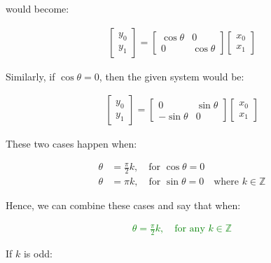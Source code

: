\documentclass{article}
\begin{document}
would become:

\begin{align*}
    \begin{bmatrix}
        y_0 \\
        y_1 
    \end{bmatrix}
    = 
    \begin{bmatrix}
        \cos \theta & 0 \\
        0 & \cos \theta
    \end{bmatrix}
    \begin{bmatrix}
        x_0 \\
        x_1
    \end{bmatrix}
\end{align*}

Similarly, if $\cos \theta = 0$, then the given system would be:

\begin{align*}
    \begin{bmatrix}
        y_0 \\
        y_1 
    \end{bmatrix}
    = 
    \begin{bmatrix}
        0 & \sin \theta \\
        -\sin \theta & 0
    \end{bmatrix}
    \begin{bmatrix}
        x_0 \\
        x_1
    \end{bmatrix}
\end{align*}

These two cases happen when:

\begin{align*}
    \theta &= \frac{\pi}{2} k, \quad \text{for } \cos \theta = 0 \\
    \theta &= \pi k, \quad \text{for } \sin \theta = 0 \quad \text{where } k \in \mathbb{Z}
\end{align*}
\bigskip

Hence, we can combine these cases and say that when:

\textcolor{Green}{
\begin{align*}
    \theta = \frac{\pi}{2} k, \quad \text{for any } k \in \mathbb{Z}
\end{align*}
}

If $k$ is odd:
\end{document}

